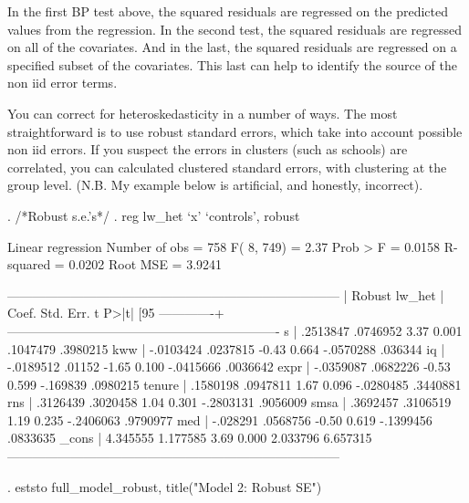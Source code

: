 \documentclass[12pt]{article}
\begin{document}
In the first BP test above, the squared residuals are regressed on the
predicted values from the regression. In the second test, the squared
residuals are regressed on all of the covariates. And in the last,
the squared residuals are regressed on a specified subset of the
covariates. This last can help to identify the source of the non iid
error terms.  

You can correct for heteroskedasticity in a number of ways. The most straightforward
is to use robust standard errors, which take into account possible non
iid errors. If you suspect the errors in clusters (such as schools)
are correlated, you can calculated clustered standard errors, with
clustering at the group level. (N.B. My example below is artificial,
and honestly, incorrect).  

\begin{stlog}
  
. /*Robust s.e.'s*/
. reg lw_het `x' `controls', robust

Linear regression                                      Number of obs =     758
                                                       F(  8,   749) =    2.37
                                                       Prob > F      =  0.0158
                                                       R-squared     =  0.0202
                                                       Root MSE      =  3.9241

------------------------------------------------------------------------------
             |               Robust
      lw_het |      Coef.   Std. Err.      t    P>|t|     [95%
-------------+----------------------------------------------------------------
           s |   .2513847   .0746952     3.37   0.001     .1047479    .3980215
         kww |  -.0103424   .0237815    -0.43   0.664    -.0570288     .036344
          iq |  -.0189512     .01152    -1.65   0.100    -.0415666    .0036642
        expr |  -.0359087   .0682226    -0.53   0.599     -.169839    .0980215
      tenure |   .1580198   .0947811     1.67   0.096    -.0280485    .3440881
         rns |   .3126439   .3020458     1.04   0.301    -.2803131    .9056009
        smsa |   .3692457   .3106519     1.19   0.235    -.2406063    .9790977
         med |   -.028291   .0568756    -0.50   0.619    -.1399456    .0833635
       _cons |   4.345555   1.177585     3.69   0.000     2.033796    6.657315
------------------------------------------------------------------------------

. eststo full_model_robust, title("Model 2: Robust SE")


\end{stlog}
\end{document}
